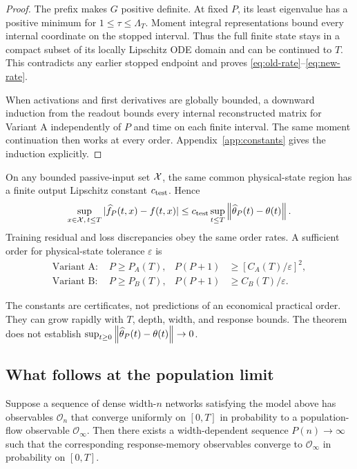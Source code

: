 \begin{proof}
The prefix makes $G$ positive definite.  At fixed $P$, its least eigenvalue
has a positive minimum for $1\le\tau\le\Lambda_T$.  Moment integral
representations bound every internal coordinate on the stopped interval.
Thus the full finite state stays in a compact subset of its locally Lipschitz
ODE domain and can be continued to $T$.  This contradicts any earlier stopped
endpoint and proves \eqref{eq:old-rate}--\eqref{eq:new-rate}.

When activations and first derivatives are globally bounded, a downward
induction from the readout bounds every internal reconstructed matrix for
Variant A independently of $P$ and time on each finite interval.  The same
moment continuation then works at every order.  Appendix~\ref{app:constants}
gives the induction explicitly.
\end{proof}

\begin{corollary}
\label{cor:outputs}
On any bounded passive-input set $\mathcal X$, the same common physical-state region
has a finite output Lipschitz constant $c_{\rm test}$.  Hence
\begin{equation}
 \sup_{x\in\mathcal X,\,t\le T}
 |\widehat f_P(t,x)-f(t,x)|
 \le c_{\rm test}\sup_{t\le T}\left\lVert \widehat\theta_P(t)-\theta(t)\right\rVert.
\end{equation}
Training residual and loss discrepancies obey the same order rates.  A
sufficient order for physical-state tolerance $\varepsilon$ is
\begin{align}
\text{Variant A: }&P\ge P_A(T),&
P(P+1)&\ge[C_A(T)/\varepsilon]^2,\nonumber\\
\text{Variant B: }&P\ge P_B(T),&
P(P+1)&\ge C_B(T)/\varepsilon.
\label{eq:order-selection}
\end{align}
\end{corollary}

The constants are certificates, not predictions of an economical practical
order.  They can grow rapidly with $T$, depth, width, and response bounds.
The theorem does not establish
$\sup_{t\ge0}\left\lVert \widehat\theta_P(t)-\theta(t)\right\rVert\to0$.

\subsection{What follows at the population limit}
\label{sec:population-bridge}

\begin{corollary}
\label{cor:diagonal}
Suppose a sequence of dense width-$n$ networks satisfying the model above has
observables $\mathcal O_n$ that converge uniformly on $[0,T]$ in probability
to a population-flow observable $\mathcal O_\infty$.  Then there exists a
width-dependent sequence $P(n)\to\infty$ such that the corresponding
response-memory observables converge to $\mathcal O_\infty$ in probability on
$[0,T]$.
\end{corollary}

